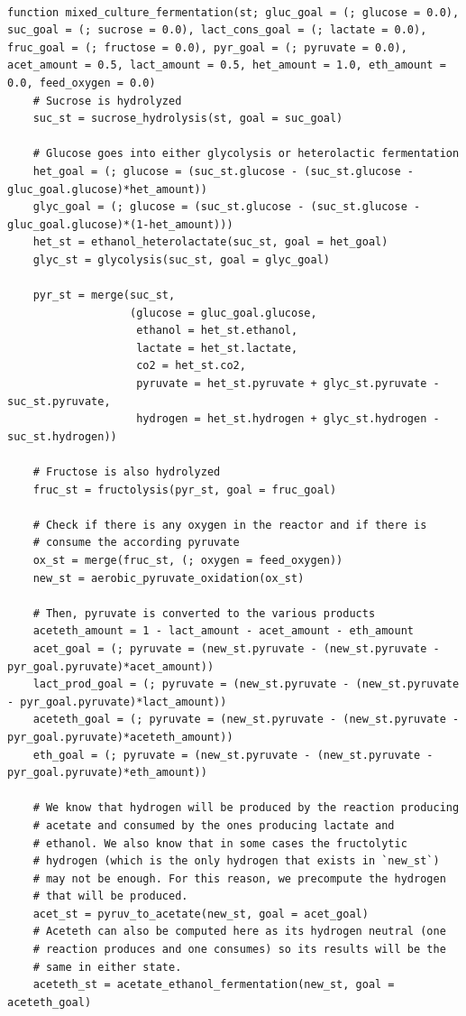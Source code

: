 \documentclass[11pt]{article}
\begin{document}
\begin{verbatim}

function mixed_culture_fermentation(st; gluc_goal = (; glucose = 0.0), suc_goal = (; sucrose = 0.0), lact_cons_goal = (; lactate = 0.0), fruc_goal = (; fructose = 0.0), pyr_goal = (; pyruvate = 0.0), acet_amount = 0.5, lact_amount = 0.5, het_amount = 1.0, eth_amount = 0.0, feed_oxygen = 0.0)
    # Sucrose is hydrolyzed
    suc_st = sucrose_hydrolysis(st, goal = suc_goal)

    # Glucose goes into either glycolysis or heterolactic fermentation
    het_goal = (; glucose = (suc_st.glucose - (suc_st.glucose - gluc_goal.glucose)*het_amount))
    glyc_goal = (; glucose = (suc_st.glucose - (suc_st.glucose - gluc_goal.glucose)*(1-het_amount)))
    het_st = ethanol_heterolactate(suc_st, goal = het_goal)
    glyc_st = glycolysis(suc_st, goal = glyc_goal)

    pyr_st = merge(suc_st,
                   (glucose = gluc_goal.glucose,
                    ethanol = het_st.ethanol,
                    lactate = het_st.lactate,
                    co2 = het_st.co2,
                    pyruvate = het_st.pyruvate + glyc_st.pyruvate - suc_st.pyruvate,
                    hydrogen = het_st.hydrogen + glyc_st.hydrogen - suc_st.hydrogen))

    # Fructose is also hydrolyzed
    fruc_st = fructolysis(pyr_st, goal = fruc_goal)

    # Check if there is any oxygen in the reactor and if there is
    # consume the according pyruvate
    ox_st = merge(fruc_st, (; oxygen = feed_oxygen))
    new_st = aerobic_pyruvate_oxidation(ox_st)

    # Then, pyruvate is converted to the various products
    aceteth_amount = 1 - lact_amount - acet_amount - eth_amount
    acet_goal = (; pyruvate = (new_st.pyruvate - (new_st.pyruvate - pyr_goal.pyruvate)*acet_amount))
    lact_prod_goal = (; pyruvate = (new_st.pyruvate - (new_st.pyruvate - pyr_goal.pyruvate)*lact_amount))
    aceteth_goal = (; pyruvate = (new_st.pyruvate - (new_st.pyruvate - pyr_goal.pyruvate)*aceteth_amount))
    eth_goal = (; pyruvate = (new_st.pyruvate - (new_st.pyruvate - pyr_goal.pyruvate)*eth_amount))

    # We know that hydrogen will be produced by the reaction producing
    # acetate and consumed by the ones producing lactate and
    # ethanol. We also know that in some cases the fructolytic
    # hydrogen (which is the only hydrogen that exists in `new_st`)
    # may not be enough. For this reason, we precompute the hydrogen
    # that will be produced.
    acet_st = pyruv_to_acetate(new_st, goal = acet_goal)
    # Aceteth can also be computed here as its hydrogen neutral (one
    # reaction produces and one consumes) so its results will be the
    # same in either state.
    aceteth_st = acetate_ethanol_fermentation(new_st, goal = aceteth_goal)


\end{verbatim}
\end{document}
